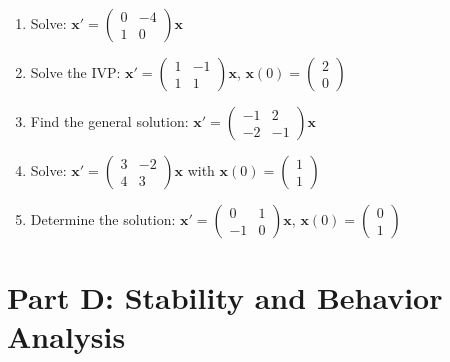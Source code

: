 \documentclass[12pt]{article}
\begin{document}
\begin{enumerate}[start=11]
\item Solve: $\mathbf{x}' = \begin{pmatrix} 0 & -4 \\ 1 & 0 \end{pmatrix}\mathbf{x}$

\item Solve the IVP: $\mathbf{x}' = \begin{pmatrix} 1 & -1 \\ 1 & 1 \end{pmatrix}\mathbf{x}$, $\mathbf{x}(0) = \begin{pmatrix} 2 \\ 0 \end{pmatrix}$

\item Find the general solution: $\mathbf{x}' = \begin{pmatrix} -1 & 2 \\ -2 & -1 \end{pmatrix}\mathbf{x}$

\item Solve: $\mathbf{x}' = \begin{pmatrix} 3 & -2 \\ 4 & 3 \end{pmatrix}\mathbf{x}$ with $\mathbf{x}(0) = \begin{pmatrix} 1 \\ 1 \end{pmatrix}$

\item Determine the solution: $\mathbf{x}' = \begin{pmatrix} 0 & 1 \\ -1 & 0 \end{pmatrix}\mathbf{x}$, $\mathbf{x}(0) = \begin{pmatrix} 0 \\ 1 \end{pmatrix}$
\end{enumerate}

\section*{Part D: Stability and Behavior Analysis}
\end{document}
